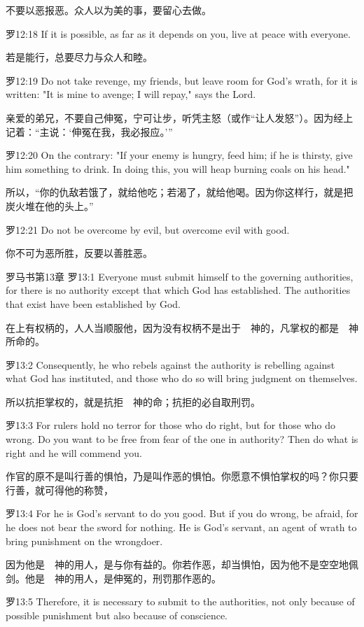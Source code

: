 \documentclass[a4paper,11pt,onecolumn,twoside]{ctexart}
\begin{document}
\begin{multicols}{2}
 不要以恶报恶。众人以为美的事，要留心去做。


 罗12:18
 If it is possible, as far as it depends on you, live at peace with everyone.

 若是能行，总要尽力与众人和睦。


 罗12:19
 Do not take revenge, my friends, but leave room for God's wrath, for it is written: "It is mine to avenge; I will repay," says the Lord.

 亲爱的弟兄，不要自己伸冤，宁可让步，听凭主怒（或作“让人发怒”）。因为经上记着：“主说：‘伸冤在我，我必报应。’”


 罗12:20
 On the contrary: "If your enemy is hungry, feed him; if he is thirsty, give him something to drink. In doing this, you will heap burning coals on his head."

 所以，“你的仇敌若饿了，就给他吃；若渴了，就给他喝。因为你这样行，就是把炭火堆在他的头上。”


 罗12:21
 Do not be overcome by evil, but overcome evil with good.

 你不可为恶所胜，反要以善胜恶。


 罗马书第13章
 罗13:1
 Everyone must submit himself to the governing authorities, for there is no authority except that which God has established. The authorities that exist have been established by God.

 在上有权柄的，人人当顺服他，因为没有权柄不是出于　神的，凡掌权的都是　神所命的。


 罗13:2
 Consequently, he who rebels against the authority is rebelling against what God has instituted, and those who do so will bring judgment on themselves.

 所以抗拒掌权的，就是抗拒　神的命；抗拒的必自取刑罚。


 罗13:3
 For rulers hold no terror for those who do right, but for those who do wrong. Do you want to be free from fear of the one in authority? Then do what is right and he will commend you.

 作官的原不是叫行善的惧怕，乃是叫作恶的惧怕。你愿意不惧怕掌权的吗？你只要行善，就可得他的称赞，


 罗13:4
 For he is God's servant to do you good. But if you do wrong, be afraid, for he does not bear the sword for nothing. He is God's servant, an agent of wrath to bring punishment on the wrongdoer.

 因为他是　神的用人，是与你有益的。你若作恶，却当惧怕，因为他不是空空地佩剑。他是　神的用人，是伸冤的，刑罚那作恶的。


 罗13:5
 Therefore, it is necessary to submit to the authorities, not only because of possible punishment but also because of conscience.


\end{multicols}
\end{document}
